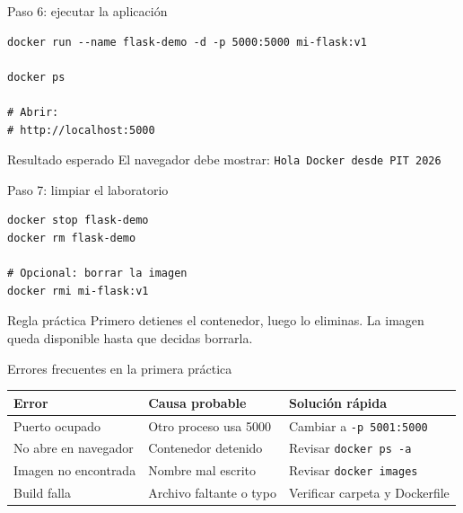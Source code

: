 \documentclass[aspectratio=169]{beamer}
\begin{document}
\begin{frame}[fragile]{Paso 6: ejecutar la aplicación}
\begin{lstlisting}[style=terminal]
docker run --name flask-demo -d -p 5000:5000 mi-flask:v1

docker ps

# Abrir:
# http://localhost:5000
\end{lstlisting}
  \begin{block}{Resultado esperado}
    El navegador debe mostrar: \texttt{Hola Docker desde PIT 2026}
  \end{block}
\end{frame}

\begin{frame}[fragile]{Paso 7: limpiar el laboratorio}
\begin{lstlisting}[style=terminal]
docker stop flask-demo
docker rm flask-demo

# Opcional: borrar la imagen
docker rmi mi-flask:v1
\end{lstlisting}
  \begin{alertblock}{Regla práctica}
    Primero detienes el contenedor, luego lo eliminas. La imagen queda disponible hasta que decidas borrarla.
  \end{alertblock}
\end{frame}

\begin{frame}{Errores frecuentes en la primera práctica}
  \footnotesize
  \begin{tabular}{p{} p{} p{}}
    \toprule
    Error & Causa probable & Solución rápida \\
    \midrule
    Puerto ocupado & Otro proceso usa 5000 & Cambiar a \texttt{-p 5001:5000} \\
    No abre en navegador & Contenedor detenido & Revisar \texttt{docker ps -a} \\
    Imagen no encontrada & Nombre mal escrito & Revisar \texttt{docker images} \\
    Build falla & Archivo faltante o typo & Verificar carpeta y Dockerfile \\
    \bottomrule
  \end{tabular}
\end{frame}
\end{document}
